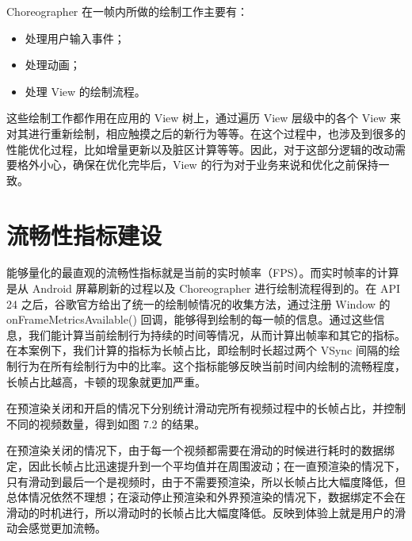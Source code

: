 Choreographer 在一帧内所做的绘制工作主要有：

\begin{itemize}
    \item 处理用户输入事件；
    \item 处理动画；
    \item 处理 View 的绘制流程。
\end{itemize}

这些绘制工作都作用在应用的 View 树上，通过遍历 View 层级中的各个 View 来对其进行重新绘制，相应触摸之后的新行为等等。在这个过程中，也涉及到很多的性能优化过程，比如增量更新以及脏区计算等等。因此，对于这部分逻辑的改动需要格外小心，确保在优化完毕后，View 的行为对于业务来说和优化之前保持一致。

\section{流畅性指标建设}

能够量化的最直观的流畅性指标就是当前的实时帧率（FPS）。而实时帧率的计算是从 Android 屏幕刷新的过程以及 Choreographer 进行绘制流程得到的。在 API 24 之后，谷歌官方给出了统一的绘制帧情况的收集方法，通过注册 Window 的 onFrameMetricsAvailable() 回调，能够得到绘制的每一帧的信息。通过这些信息，我们能计算当前绘制行为持续的时间等情况，从而计算出帧率和其它的指标。在本案例下，我们计算的指标为长帧占比，即绘制时长超过两个 VSync 间隔的绘制行为在所有绘制行为中的比率。这个指标能够反映当前时间内绘制的流畅程度，长帧占比越高，卡顿的现象就更加严重。

在预渲染关闭和开启的情况下分别统计滑动完所有视频过程中的长帧占比，并控制不同的视频数量，得到如图 7.2 的结果。
    


在预渲染关闭的情况下，由于每一个视频都需要在滑动的时候进行耗时的数据绑定，因此长帧占比迅速提升到一个平均值并在周围波动；在一直预渲染的情况下，只有滑动到最后一个是视频时，由于不需要预渲染，所以长帧占比大幅度降低，但总体情况依然不理想；在滚动停止预渲染和外界预渲染的情况下，数据绑定不会在滑动的时机进行，所以滑动时的长帧占比大幅度降低。反映到体验上就是用户的滑动会感觉更加流畅。